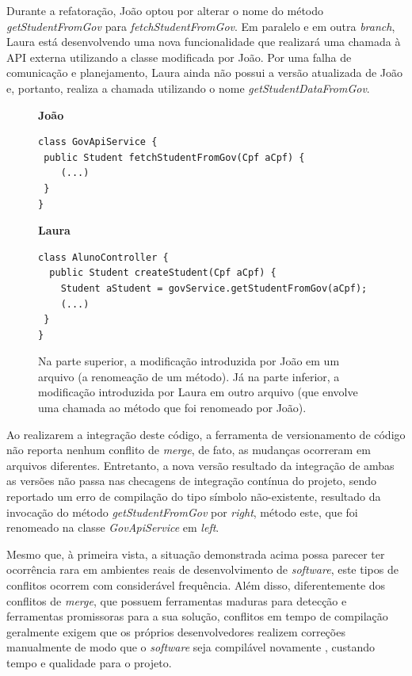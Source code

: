 \documentclass[12pt]{article}
\begin{document}
Durante a refatoração, João optou por alterar o nome do método \textit{getStudentFromGov} para \textit{fetchStudentFromGov}. Em paralelo e em outra \textit{branch}, Laura está desenvolvendo uma nova funcionalidade que realizará uma chamada à API externa utilizando a classe modificada por João. Por uma falha de comunicação e planejamento, Laura ainda não possui a versão atualizada de João e, portanto, realiza a chamada utilizando o nome \textit{getStudentDataFromGov}.

\begin{figure}[H]
\textbf{João}
\begin{verbatim}
class GovApiService {
 public Student fetchStudentFromGov(Cpf aCpf) {
    (...)
 }
}
\end{verbatim}
\textbf{\newline Laura}
\begin{verbatim}
class AlunoController {
  public Student createStudent(Cpf aCpf) {
    Student aStudent = govService.getStudentFromGov(aCpf);
    (...)
 }
}
\end{verbatim}

\caption{Na parte superior, a modificação introduzida por João em um arquivo (a renomeação de um método). Já na parte inferior, a modificação introduzida por Laura em outro arquivo (que envolve uma chamada ao método que foi renomeado por João).
}
\label{fig:build2}
\end{figure}

Ao realizarem a integração deste código, a ferramenta de versionamento de código não reporta nenhum conflito de \textit{merge}, de fato, as mudanças ocorreram em arquivos diferentes. Entretanto, a nova versão resultado da integração de ambas as versões não passa nas checagens de integração contínua do projeto, sendo reportado um erro de compilação do tipo símbolo não-existente, resultado da invocação do método \textit{getStudentFromGov} por \textit{right}, método este, que foi renomeado na classe \textit{GovApiService} em \textit{left}.

Mesmo que, à primeira vista, a situação demonstrada acima possa parecer ter ocorrência rara em ambientes reais de desenvolvimento de \textit{software}, este tipos de conflitos ocorrem com considerável frequência. Além disso, diferentemente dos conflitos de \textit{merge}, que possuem ferramentas maduras para detecção e ferramentas promissoras para a sua solução, conflitos em tempo de compilação geralmente exigem que os próprios desenvolvedores realizem correções manualmente de modo que o \textit{software} seja compilável novamente \cite{leuson:build}, custando tempo e qualidade para o projeto.
\end{document}
